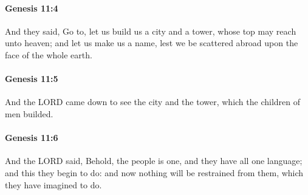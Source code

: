 		\paragraph{Genesis 11:4} %
			\label{GENESIS-11-4}

			And they said, Go to, let us build us a city and a tower, whose top may reach unto heaven; and let us make us a name, lest we be scattered abroad upon the face of the whole earth.


		\paragraph{Genesis 11:5} %
			\label{GENESIS-11-5}

			And the LORD came down to see the city and the tower, which the children of men builded.


		\paragraph{Genesis 11:6} %
			\label{GENESIS-11-6}

			And the LORD said, Behold, the people is one, and they have all one language; and this they begin to do: and now nothing will be restrained from them, which they have imagined to do.


